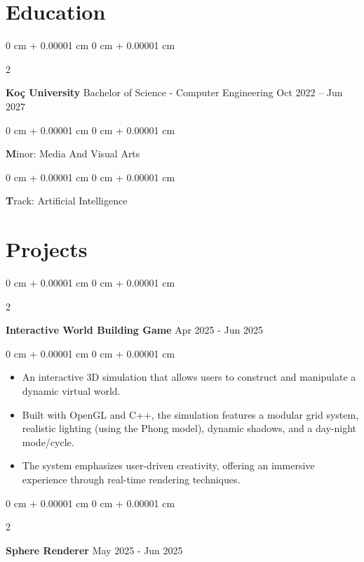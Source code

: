 \documentclass[10pt, letterpaper]{article}
\newenvironment{highlights}{
    \begin{itemize}[
        topsep=0.10 cm,
        parsep=0.10 cm,
        partopsep=0pt,
        itemsep=0pt,
        leftmargin=0 cm + 10pt
    ]
}{
    \end{itemize}
} %
\newenvironment{onecolentry}{
    \begin{adjustwidth}{
        0 cm + 0.00001 cm
    }{
        0 cm + 0.00001 cm
    }
}{
    \end{adjustwidth}
} %
\newenvironment{twocolentry}[2][]{
    \onecolentry
    \def\secondColumn{#2}
    \setcolumnwidth{\fill, 4.5 cm}
    \begin{paracol}{2}
}{
    \switchcolumn \raggedleft \secondColumn
    \end{paracol}
    \endonecolentry
} %
\begin{document}
    
    \section{Education}
        
        \begin{twocolentry}{
            Oct 2022 – Jun 2027
        }
            \textbf{Koç University} Bachelor of Science - Computer Engineering\end{twocolentry}
            \begin{onecolentry}
            \textbf Minor: Media And Visual Arts
            \end{onecolentry}
            \begin{onecolentry}
            \textbf Track: Artificial Intelligence
            \end{onecolentry}

    
    \section{Projects}



        
        \begin{twocolentry}{
            Apr 2025 - Jun 2025
        }
            \textbf{
Interactive World Building Game}\end{twocolentry}

        \vspace{0.10 cm}
        \begin{onecolentry}
            \begin{highlights}
                \item An interactive 3D simulation that allows users to construct and manipulate a dynamic virtual world. 
                \item Built with OpenGL and C++, the simulation features a modular grid system, realistic lighting (using the Phong model), dynamic shadows, and a day-night mode/cycle. 
                \item The system emphasizes user-driven creativity, offering an immersive experience through real-time rendering techniques.
            \end{highlights}
        \end{onecolentry}

        \vspace{0.2 cm}

                \begin{twocolentry}{
            May 2025 - Jun 2025
        }
            \textbf{Sphere Renderer}\end{twocolentry}
\end{document}
